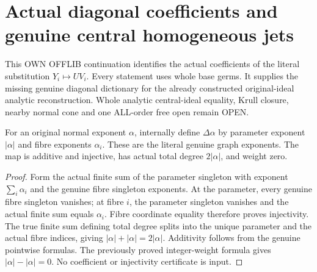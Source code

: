 \section{Actual diagonal coefficients and genuine central homogeneous jets}
This OWN OFFLIB continuation identifies the actual coefficients of the literal substitution $Y_i\mapsto UV_i$. Every statement uses whole base germs. It supplies the missing genuine diagonal dictionary for the already constructed original-ideal analytic reconstruction. Whole analytic central-ideal equality, Krull closure, nearby normal cone and one ALL-order free open remain OPEN.

\begin{lemma}
\label{hir:relative-normal-graph-diagonal-actual-exponent}
\leanok
For an original normal exponent $\alpha$, internally define $\Delta\alpha$ by parameter exponent $|\alpha|$ and fibre exponents $\alpha_i$. These are the literal genuine graph exponents. The map is additive and injective, has actual total degree $2|\alpha|$, and weight zero.
\end{lemma}
\begin{proof}
Form the actual finite sum of the parameter singleton with exponent $\sum_i\alpha_i$ and the genuine fibre singleton exponents. At the parameter, every genuine fibre singleton vanishes; at fibre $i$, the parameter singleton vanishes and the actual finite sum equals $\alpha_i$. Fibre coordinate equality therefore proves injectivity. The true finite sum defining total degree splits into the unique parameter and the actual fibre indices, giving $|\alpha|+|\alpha|=2|\alpha|$. Additivity follows from the genuine pointwise formulas. The previously proved integer-weight formula gives $|\alpha|-|\alpha|=0$. No coefficient or injectivity certificate is input.
\end{proof}

